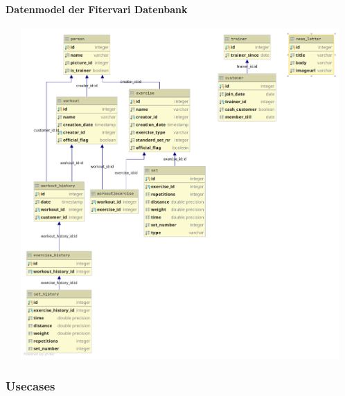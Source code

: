 \documentclass[12pt]{article}
\theoremstyle{definition}
\begin{document}
\paragraph{Datenmodel der Fitervari Datenbank}
\begin{center}

\includegraphics[width=15cm, height=12.6cm]{datenmodel.png}

\end{center}
\pagebreak

\subsubsection{Usecases}
\end{document}
